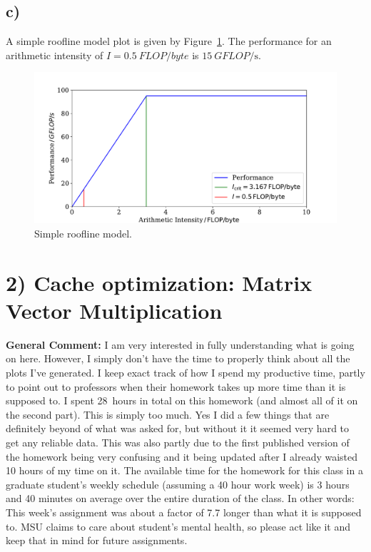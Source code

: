 \documentclass[a4paper, 11pt]{article}
\begin{document}
\newpage
\subsection*{c)}
A simple roofline model plot is given by Figure~\ref{fig:roofline}. The
performance for an arithmetic intensity of $I = \SI{0.5}{FLOP\per byte}$ is
$\SI{15}{GFLOP\per\second}$.
\begin{figure}
  \centering
  \includegraphics[width=\textwidth]{../plot/roofline.pdf}
  \caption{Simple roofline model.}
  \label{fig:roofline}
\end{figure}

\section*{2) Cache optimization: Matrix Vector Multiplication}

\textbf{General Comment:} I am very interested in fully understanding what is
going on here. However, I simply don't have the time to properly think about
all the plots I've generated. I keep exact track of how I spend my productive
time, partly to point out to professors when their homework takes up more time
than it is supposed to. I spent \SI{28}{hours} in total on this homework (and
almost all of it on the second part). This is simply too much. Yes I did a few
things that are definitely beyond of what was asked for, but without it it
seemed very hard to get any reliable data. This was also partly due to the
first published version of the homework being very confusing and it being
updated after I already waisted 10 hours of my time on it. The available time
for the homework for this class in a graduate student's weekly schedule
(assuming a 40 hour work week) is 3 hours and 40 minutes on average over the
entire duration of the class. In other words: This week's assignment was about
a factor of 7.7 longer than what it is supposed to. MSU claims to care about
student's mental health, so please act like it and keep that in mind for future
assignments.
\end{document}
